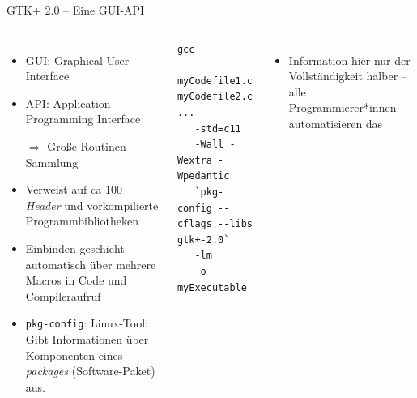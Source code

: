 
\begin{frame}[fragile]{GTK+ 2.0 -- Eine GUI-API}
%
\begin{columns}[T]
\begin{itemize}
\item GUI: Graphical User Interface
\item API: Application Programming Interface
\item[$\Rightarrow$] Große Routinen-Sammlung
\item Verweist auf ca 100 \emph{Header} und vorkompilierte Programmbibliotheken
\item Einbinden geschieht automatisch über mehrere Macros in Code und Compileraufruf
\item \texttt{pkg-config}: Linux-Tool: Gibt Informationen über Komponenten eines \emph{packages} (Software-Paket) aus.
\end{itemize}
%
\vspace{-6pt}
\begin{cmdbox}
\begin{verbatim}
gcc 
   myCodefile1.c myCodefile2.c ...
   -std=c11
   -Wall -Wextra -Wpedantic
   `pkg-config --cflags --libs gtk+-2.0`
   -lm 
   -o myExecutable
\end{verbatim}
\end{cmdbox}
%
\begin{itemize}
\item Information hier nur der Vollständigkeit halber -- alle Programmierer*innen automatisieren das
\end{itemize}
\end{columns}
%
\end{frame}


